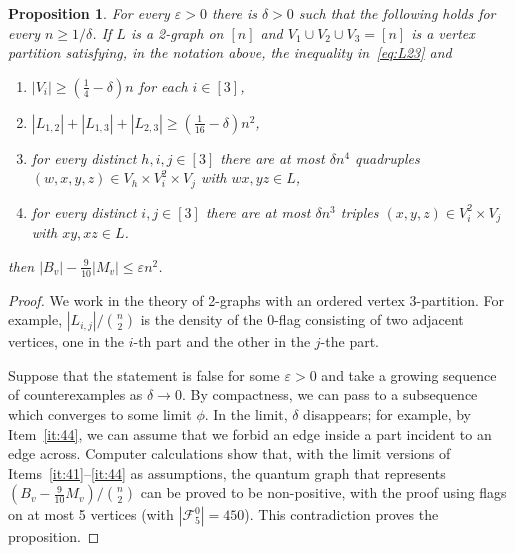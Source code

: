 \documentclass[11pt,a4paper]{article}
\newtheorem{proposition}[definition]{Proposition}
\theoremstyle{remark}
\newcommand{\C}[1]{\mathcal{#1}}
\newcommand{\e}{\varepsilon}
\begin{document}
\begin{proposition}\label{pr:4} For every $\e>0$ there is $\delta>0$ such that the following holds for every $n\ge 1/\delta$. If $L$ is a 2-graph  on $[n]$ and $V_1\cup V_2\cup V_3=[n]$ is a vertex partition satisfying, in the notation above, the inequality in~\eqref{eq:L23} and
\begin{enumerate}[label=(\roman*)]
        \item\label{it:41}  $|V_i|\ge (\frac14-\delta)n$ for each $i\in [3]$,
        \item\label{it:42} $|L_{1,2}|+|L_{1,3}|+|L_{2,3}|\ge (\frac1{16}-\delta) n^2$, 
        \item\label{it:43} for every distinct $h,i,j\in [3]$ there are at most $\delta n^4$ quadruples $(w,x,y,z)\in V_h\times V_i^2\times V_j$ with 
        $wx,yz\in L$,
        \item\label{it:44} for every distinct $i,j\in [3]$ there are at most $\delta n^3$ triples $(x,y,z)\in V_i^2\times V_j$ with $xy,xz \in L$.
        \end{enumerate}
 then $|B_{v}|-\frac9{10}|M_{v}|\le \e n^2$.
 \end{proposition}
 \begin{proof}
 We work in the theory of 2-graphs with an ordered vertex $3$-partition. For example, $|L_{i,j}|/{n\choose 2}$ is the density of the 0-flag consisting of two adjacent vertices, one in the $i$-th part and the other in the $j$-the part. 
 
Suppose that the statement is false for some $\e>0$ and take a growing sequence of counterexamples as $\delta\to 0$. By compactness, we can pass to a subsequence which converges to some limit $\phi$. 
In the limit, $\delta$ disappears; for example, by Item~\ref{it:44}, we can assume that we forbid an edge inside a part incident to an edge across. Computer calculations show that, with the limit versions of Items~\ref{it:41}--\ref{it:44} as assumptions, the quantum graph that represents $(B_{v}-\frac9{10}M_{v})/{n\choose 2}$ can be proved to be non-positive,  with the proof using flags on at most 5 vertices (with $|\C F_5^0|=450$). This contradiction proves the proposition. 
 \end{proof}

\end{document}
